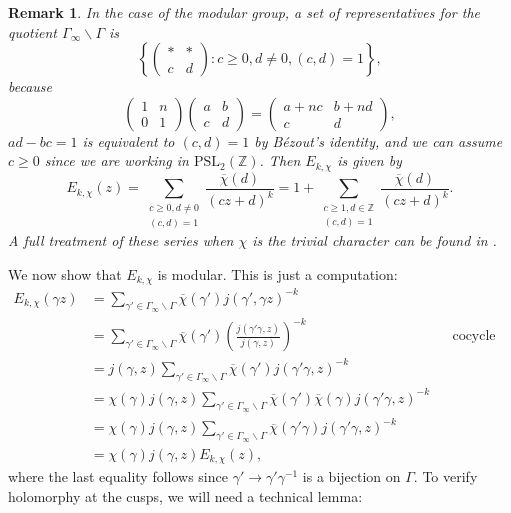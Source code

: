 \documentclass[12pt]{book}
\newtheorem{remark}{Remark}[section]
\theoremstyle{definition}\newframedtheorem{method}{Method}
\newcommand{\PSL}{\mathrm{PSL}}
\newcommand{\Z}{\mathbb{Z}}
\newcommand{\g}{\gamma}
\newcommand{\G}{\Gamma}
\newcommand{\<}{\langle}
\renewcommand{\>}{\rangle}
\newcommand{\conj}{\overline}
\newcommand{\cchi}{\conj{\chi}}
\newcommand{\GG}{\G_{\infty}\backslash\G}
\begin{document}
      \begin{remark}\label{rem:Eisenstein_series_on_modular_group}
        In the case of the modular group, a set of representatives for the quotient $\GG$ is
       \[
         \left\{\begin{pmatrix} \ast & \ast \\ c & d \end{pmatrix}:c \ge 0, d \neq 0, (c,d) = 1\right\},
       \]
       because
       \[
         \begin{pmatrix} 1 & n \\ 0 & 1 \end{pmatrix}\begin{pmatrix} a & b \\ c & d \end{pmatrix} = \begin{pmatrix} a+nc & b+nd \\ c & d \end{pmatrix},
       \]
       $ad-bc = 1$ is equivalent to $(c,d) = 1$ by B\'ezout's identity, and we can assume $c \ge 0$ since we are working in $\PSL_{2}(\Z)$. Then $E_{k,\chi}$ is given by
        \[
          E_{k,\chi}(z) = \sum_{\substack{c \ge 0, d \neq 0 \\ (c,d) = 1}}\frac{\cchi(d)}{(cz+d)^{k}} = 1+\sum_{\substack{c \ge 1, d \in \Z \\ (c,d) = 1}}\frac{\cchi(d)}{(cz+d)^{k}}.
        \]
        A full treatment of these series when $\chi$ is the trivial character can be found in \cite{conrad2016modular}.
      \end{remark}

      We now show that $E_{k,\chi}$ is modular. This is just a computation:
      \begin{align*}
        E_{k,\chi}(\g z) &= \sum_{\g' \in \GG}\cchi(\g')j(\g',\g z)^{-k} \\
        &= \sum_{\g' \in \GG}\cchi(\g')\left(\frac{j(\g'\g,z)}{j(\g,z)}\right)^{-k} && \text{cocycle condition} \\
        &= j(\g,z)\sum_{\g' \in \GG}\cchi(\g')j(\g'\g,z)^{-k} \\
        &= \chi(\g)j(\g,z)\sum_{\g' \in \GG}\cchi(\g')\cchi(\g)j(\g'\g,z)^{-k} \\
        &= \chi(\g)j(\g,z)\sum_{\g' \in \GG}\cchi(\g'\g)j(\g'\g,z)^{-k} \\
        &= \chi(\g)j(\g,z)E_{k,\chi}(z),
      \end{align*}
      where the last equality follows since $\g' \to \g'\g^{-1}$ is a bijection on $\G$. To verify holomorphy at the cusps, we will need a technical lemma:
\end{document}
